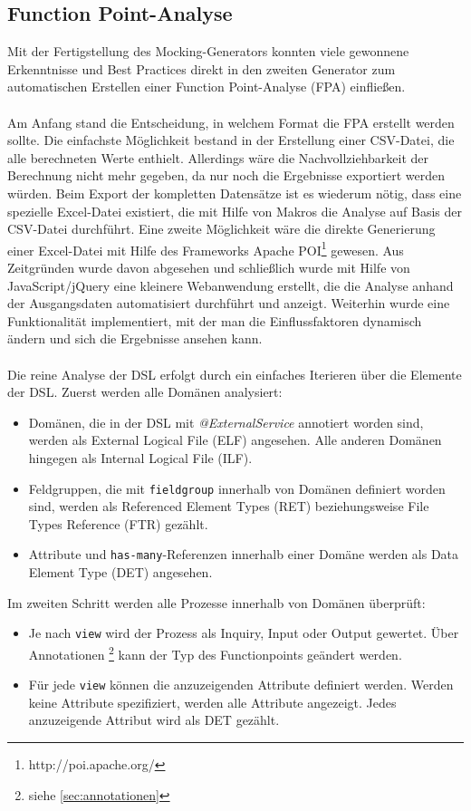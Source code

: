 \documentclass[a4paper,12pt]{scrreprt}
\begin{document}
\subsection{Function Point-Analyse}
Mit der Fertigstellung des Mocking-Generators konnten viele gewonnene Erkenntnisse und Best Practices direkt in den zweiten Generator zum automatischen Erstellen einer Function Point-Analyse (FPA) einfließen.
\\
\\ 
Am Anfang stand die Entscheidung, in welchem Format die FPA erstellt werden sollte. Die einfachste Möglichkeit bestand in der Erstellung einer CSV-Datei, die alle berechneten Werte enthielt. Allerdings wäre die Nachvollziehbarkeit der Berechnung nicht mehr gegeben, da nur noch die Ergebnisse exportiert werden würden. Beim Export der kompletten Datensätze ist es wiederum nötig, dass eine spezielle Excel-Datei existiert, die mit Hilfe von Makros die Analyse auf Basis der CSV-Datei durchführt. Eine zweite Möglichkeit wäre die direkte Generierung einer Excel-Datei mit Hilfe des Frameworks Apache POI\footnote{http://poi.apache.org/} gewesen. Aus Zeitgründen wurde davon abgesehen und schließlich wurde mit Hilfe von JavaScript/jQuery eine kleinere Webanwendung erstellt, die die Analyse anhand der Ausgangsdaten automatisiert durchführt und anzeigt. Weiterhin wurde eine Funktionalität implementiert, mit der man die Einflussfaktoren dynamisch ändern und sich die Ergebnisse ansehen kann.
\\
\\
Die reine Analyse der DSL erfolgt durch ein einfaches Iterieren über die Elemente der DSL. Zuerst werden alle Domänen analysiert:
\begin{itemize}
	\item Domänen, die in der DSL mit  \textit{@ExternalService} annotiert worden sind, werden als External Logical File (ELF) angesehen. Alle anderen Domänen hingegen als Internal Logical File (ILF).
	\item Feldgruppen, die mit \texttt{fieldgroup} innerhalb von Domänen definiert worden sind, werden als Referenced Element Types (RET) beziehungsweise File Types Reference (FTR) gezählt.
	\item Attribute und \texttt{has-many}-Referenzen innerhalb einer Domäne werden als Data Element Type (DET) angesehen.
\end{itemize}
Im zweiten Schritt werden alle Prozesse innerhalb von Domänen überprüft:
\begin{itemize}
	\item Je nach \texttt{view} wird der Prozess als Inquiry, Input oder Output gewertet. Über Annotationen \footnote{siehe \ref{sec:annotationen}} kann der Typ des Functionpoints geändert werden.
	\item Für jede \texttt{view} können die anzuzeigenden Attribute definiert werden. Werden keine Attribute spezifiziert, werden alle Attribute angezeigt. Jedes anzuzeigende Attribut wird als DET gezählt. 
\end{itemize}
\end{document}
